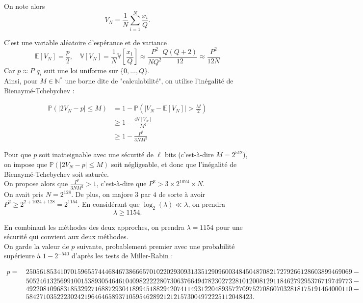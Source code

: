 \documentclass{article}
\newcommand{\bE}{\mathbb{E}}
\newcommand{\bV}{\mathbb{V}}
\begin{document}
On note alors \[V_N = \frac 1N\sum_{i=1}^N \frac{x_i}{Q}. \]

C'est une variable aléatoire d'espérance et de variance \[\bE[V_N] = \frac{p}{2}, \quad \bV[V_N] = \frac{1}{N}\bV\left[\frac{x_1}{Q}\right] \approx \frac{P^2}{NQ^2}\frac{Q(Q+2)}{12} \approx \frac{P^2}{12N}\]
Car $p\approx P$ $q_i$ suit une loi uniforme sur $\{0,\dots,Q\}$.\\
Ainsi, pour $M\in \mathbb{N}^*$ une borne dite de "calculabilité", on utilise l'inégalité de Bienaymé-Tchebychev :

\begin{align*}
\mathbb{P}(|2V_N-p| \leq M) &= 1 - \mathbb{P}(|V_N-\bE[V_N]| > \frac{M}{2}) \\
&\geq 1 - \frac{4\bV[V_N]}{M^2}\\
&\geq 1 - \frac{P^2}{3NM^2}
\end{align*}

Pour que $p$ soit inatteignable avec une sécurité de $\ell$ bits (c'est-à-dire $M = 2^{512}$), on impose que $\mathbb{P}(|2V_N-p| \leq M)$ soit négligeable, et donc que l'inégalité de Bienaymé-Tchebychev soit saturée.\\
On propose alors que $\frac{P^2}{3NM^2} > 1$, c'est-à-dire que $P^2 > 3\times 2^{1024}\times N$.\\

On avait pris $N = 2^{128}$. De plus, on majore $3$ par $4$ de sorte à avoir $P^2 \geq 2^{2+1024+128} = 2^{1154}$. En considérant que $\log_2(\lambda) \ll \lambda$, on prendra \[\lambda \geq 1154.\]

En combinant les méthodes des deux approches, on prendra $\lambda = 1154$ pour une sécurité qui convient aux deux méthodes.\\

On garde la valeur de $p$ suivante, probablement premier avec une probabilité supérieure à $1 - 2^{-540}$ d'après les tests de Miller-Rabin :

\begin{align*}
p = \hspace{2pt}&25056185341070159655744468467386665701022029309313351290960034845048708217279266128603899469069-\\
&50524613256991001538930546461040982222280730637664947823027228101200812911846279295376719749773-\\
&49220810968318532927168872930418994518829420741149312204893572709752708607032818175191464000110-\\
&584271035222302421964646589371059546289212121573004972225112048423.
\end{align*}
\end{document}
